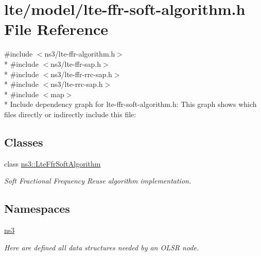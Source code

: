 \hypertarget{lte-ffr-soft-algorithm_8h}{}\section{lte/model/lte-\/ffr-\/soft-\/algorithm.h File Reference}
\label{lte-ffr-soft-algorithm_8h}
{\ttfamily \#include $<$ns3/lte-\/ffr-\/algorithm.\+h$>$}\\*
{\ttfamily \#include $<$ns3/lte-\/ffr-\/sap.\+h$>$}\\*
{\ttfamily \#include $<$ns3/lte-\/ffr-\/rrc-\/sap.\+h$>$}\\*
{\ttfamily \#include $<$ns3/lte-\/rrc-\/sap.\+h$>$}\\*
{\ttfamily \#include $<$map$>$}\\*
Include dependency graph for lte-\/ffr-\/soft-\/algorithm.h\+:
This graph shows which files directly or indirectly include this file\+:
\subsection*{Classes}
\begin{DoxyCompactItemize}
\item 
class \hyperlink{classns3_1_1LteFfrSoftAlgorithm}{ns3\+::\+Lte\+Ffr\+Soft\+Algorithm}
\begin{DoxyCompactList}\small\item\em Soft Fractional Frequency Reuse algorithm implementation. \end{DoxyCompactList}\end{DoxyCompactItemize}
\subsection*{Namespaces}
\begin{DoxyCompactItemize}
\item 
 \hyperlink{namespacens3}{ns3}
\begin{DoxyCompactList}\small\item\em Here are defined all data structures needed by an O\+L\+SR node. \end{DoxyCompactList}\end{DoxyCompactItemize}
